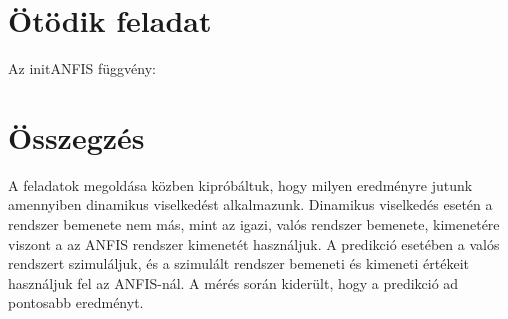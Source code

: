 \newpage
\section{Ötödik feladat}
Az initANFIS függvény:



\section{Összegzés}
A feladatok megoldása közben kipróbáltuk, hogy milyen eredményre jutunk amennyiben dinamikus viselkedést alkalmazunk. Dinamikus viselkedés esetén a rendszer bemenete nem más, mint az igazi, valós rendszer bemenete, kimenetére viszont a az ANFIS rendszer kimenetét használjuk. 
A predikció esetében a valós rendszert szimuláljuk, és a szimulált rendszer bemeneti és kimeneti értékeit használjuk fel az ANFIS-nál. A mérés során kiderült, hogy a predikció ad pontosabb eredményt.
























